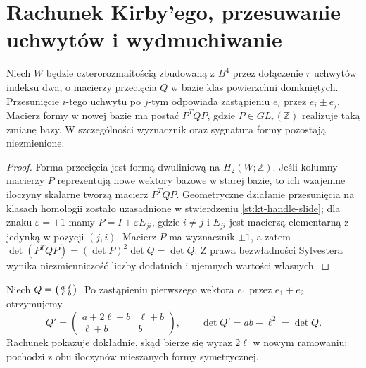 \section{Rachunek Kirby'ego, przesuwanie uchwytów i wydmuchiwanie}
\label{sec:tg-plumbing-kirby}

\begin{stwierdzenie}
Niech $W$ będzie czterorozmaitością zbudowaną z $B^4$
przez dołączenie $r$ uchwytów indeksu dwa, o macierzy
przecięcia $Q$ w bazie klas powierzchni domkniętych.
Przesunięcie $i$-tego uchwytu po $j$-tym odpowiada
zastąpieniu $e_i$ przez $e_i\pm e_j$. Macierz formy
w nowej bazie ma postać $P^TQP$, gdzie
$P\in GL_r(\mathbb Z)$ realizuje taką zmianę bazy.
W szczególności wyznacznik oraz sygnatura formy
pozostają niezmienione.
\end{stwierdzenie}
\begin{proof}
Forma przecięcia jest formą dwuliniową na
$H_2(W;\mathbb Z)$. Jeśli kolumny macierzy $P$
reprezentują nowe wektory bazowe w starej bazie,
to ich wzajemne iloczyny skalarne tworzą macierz
$P^TQP$. Geometryczne działanie przesunięcia na klasach
homologii zostało uzasadnione w stwierdzeniu
\ref{st:kt-handle-slide}; dla znaku
$\varepsilon=\pm1$ mamy $P=I+\varepsilon E_{ji}$,
gdzie $i\ne j$ i $E_{ji}$ jest macierzą
elementarną z jedynką w pozycji $(j,i)$.
Macierz $P$ ma wyznacznik $\pm1$, a zatem
$\det(P^TQP)=(\det P)^2\det Q=\det Q$.
Z prawa bezwładności Sylvestera wynika niezmienniczość
liczby dodatnich i ujemnych wartości własnych.
\end{proof}

\begin{przyklad}
Niech $Q=\begin{psmallmatrix}a&\ell\\\ell&b\end{psmallmatrix}$.
Po zastąpieniu pierwszego wektora $e_1$ przez
$e_1+e_2$ otrzymujemy
\[
Q'=\begin{pmatrix}a+2\ell+b&\ell+b\\\ell+b&b\end{pmatrix},
\qquad \det Q'=ab-\ell^2=\det Q.
\]
Rachunek pokazuje dokładnie, skąd bierze się wyraz
$2\ell$ w nowym ramowaniu: pochodzi z obu iloczynów
mieszanych formy symetrycznej.
\end{przyklad}

